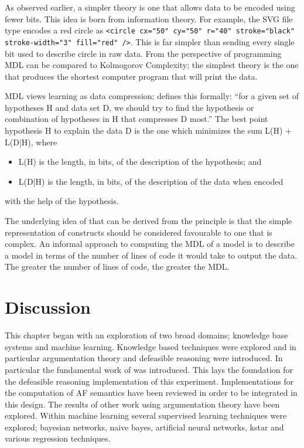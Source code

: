 As observed earlier, a simpler theory is one that allows data to be encoded using fewer bits. This idea is born from information theory. For example, the SVG file type encodes a red circle as \lstinline{<circle cx="50" cy="50" r="40" stroke="black" stroke-width="3" fill="red" />}. This is far simpler than sending every single bit used to describe circle in raw data. From the perspective of programming MDL can be compared to Kolmogorov Complexity; the simplest theory is the one that produces the shortest computer program that will print the data.

MDL views learning as data compression; \cite{grunwald2005tutorial} defines this formally: ``for a given set of hypotheses H and data set D, we should try to find the hypothesis or combination of hypotheses in H that compresses D most.'' The best point hypothesis H to explain the data D is the one which minimizes the sum L(H) + L(D|H), where
\begin{itemize}
  \item L(H) is the length, in bits, of the description of the hypothesis; and
  \item L(D|H) is the length, in bits, of the description of the data when encoded
\end{itemize}
with the help of the hypothesis.

The underlying idea of that can be derived from the principle is that the simple representation of constructs should be considered favourable to one that is complex. An informal approach to computing the MDL of a model is to describe a model in terms of the number of lines of code it would take to output the data. The greater the number of lines of code, the greater the MDL.

\section{Discussion}

This chapter began with an exploration of two broad domains; knowledge base systems and machine learning. Knowledge based techniques were explored and in particular argumentation theory and defeasible reasoning were introduced. In particular the fundamental work of \cite{dung1995acceptability} was introduced. This lays the foundation for the defeasible reasoning implementation of this experiment. Implementations for the computation of AF semantics have been reviewed in order to be integrated in this design. The results of other work using argumentation theory have been explored. Within machine learning several supervised learning techniques were explored; bayesian networks, naive bayes, artificial neural networks, kstar and various regression techniques. 

